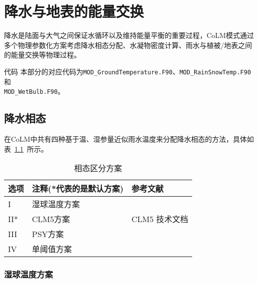 \chapter{降水与地表的能量交换}
降水是陆面与大气之间保证水循环以及维持能量平衡的重要过程，CoLM模式通过多个物理参数化方案考虑降水相态分配、水凝物密度计算、雨水与植被/地表之间的能量交换等物理过程。

\begin{mymdframed}{代码}
  本部分的对应代码为\texttt{MOD\_GroundTemperature.F90}、\texttt{MOD\_RainSnowTemp.F90}和\\
  \texttt{MOD\_WetBulb.F90}。
\end{mymdframed}

\section{降水相态}\label{相态分配}
在CoLM中共有四种基于温、湿参量近似雨水温度来分配降水相态的方法，具体如表~\ref{tab:相态区分方案}~所示。

\begin{table}[]
  \caption{相态区分方案}
  \label{tab:相态区分方案}
  \begin{tabular}[h]{p{1cm}p{5cm}p{10cm}}
    \toprule
    选项 & 注释(*代表的是默认方案) & 参考文献                                   \\ \midrule
    I    & 湿球温度方案            & \citet{Wang-etal_19WetBulb}                \\
    II*  & CLM5方案                &  CLM5 技术文档 \\
    III  & PSY方案                 & \citet{harder2013estimating}               \\
    IV   & 单阈值方案              & \citet{us1956snow}                         \\ \bottomrule
  \end{tabular}
\end{table}

\subsection{湿球温度方案}\label{湿球温度方案}

